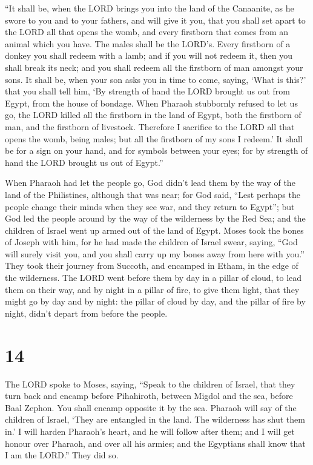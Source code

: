 ``It shall be, when the LORD brings you into the land of
the Canaanite, as he swore to you and to your fathers, and will give it
you,  that you shall set apart to the LORD all that opens
the womb, and every firstborn that comes from an animal which you have.
The males shall be the LORD's.  Every firstborn of a
donkey you shall redeem with a lamb; and if you will not redeem it, then
you shall break its neck; and you shall redeem all the firstborn of man
amongst your sons.  It shall be, when your son asks you
in time to come, saying, `What is this?' that you shall tell him, `By
strength of hand the LORD brought us out from Egypt, from the house of
bondage.  When Pharaoh stubbornly refused to let us go,
the LORD killed all the firstborn in the land of Egypt, both the
firstborn of man, and the firstborn of livestock. Therefore I sacrifice
to the LORD all that opens the womb, being males; but all the firstborn
of my sons I redeem.'  It shall be for a sign on your
hand, and for symbols between your eyes; for by strength of hand the
LORD brought us out of Egypt.''

 When Pharaoh had let the people go, God didn't lead them
by the way of the land of the Philistines, although that was near; for
God said, ``Lest perhaps the people change their minds when they see
war, and they return to Egypt'';  but God led the people
around by the way of the wilderness by the Red Sea; and the children of
Israel went up armed out of the land of Egypt.  Moses
took the bones of Joseph with him, for he had made the children of
Israel swear, saying, ``God will surely visit you, and you shall carry
up my bones away from here with you.''  They took their
journey from Succoth, and encamped in Etham, in the edge of the
wilderness.  The LORD went before them by day in a pillar
of cloud, to lead them on their way, and by night in a pillar of fire,
to give them light, that they might go by day and by night:
 the pillar of cloud by day, and the pillar of fire by
night, didn't depart from before the people.

\hypertarget{section-13}{%
\section{14}\label{section-13}}

 The LORD spoke to Moses, saying,  ``Speak
to the children of Israel, that they turn back and encamp before
Pihahiroth, between Migdol and the sea, before Baal Zephon. You shall
encamp opposite it by the sea.  Pharaoh will say of the
children of Israel, `They are entangled in the land. The wilderness has
shut them in.'  I will harden Pharaoh's heart, and he will
follow after them; and I will get honour over Pharaoh, and over all his
armies; and the Egyptians shall know that I am the LORD.'' They did so.


